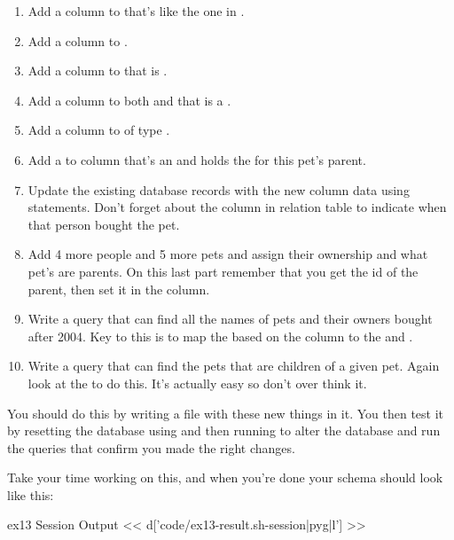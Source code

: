 \begin{enumerate}
\item Add a  column to  that's like the one in .
\item Add a  column to .
\item Add a  column to  that is .
\item Add a  column to both  and  that is a .
\item Add a  column to  of type .
\item Add a  to  column that's an  and holds the 
    for this pet's parent.
\item Update the existing database records with the new column data using  statements.  Don't forget about the  column in  relation table to indicate when that person bought the pet.
\item Add 4 more people and 5 more pets and assign their ownership and what pet's
    are parents.  On this last part remember that you get the id of the parent, then
    set it in the  column.
\item Write a query that can find all the names of pets and their owners bought after
    2004. Key to this is to map the  based on the  column to the  and .
\item Write a query that can find the pets that are children of a given pet.  Again
    look at the  to do this.  It's actually easy so don't over
    think it.
\end{enumerate}

You should do this by writing a  file with these new things in it.
You then test it by resetting the database using  and then running
 to alter the database and run the  queries that
confirm you made the right changes.

Take your time working on this, and when you're done your schema should look
like this:

\begin{code}{ex13 Session Output}
<< d['code/ex13-result.sh-session|pyg|l'] >>
\end{code}

